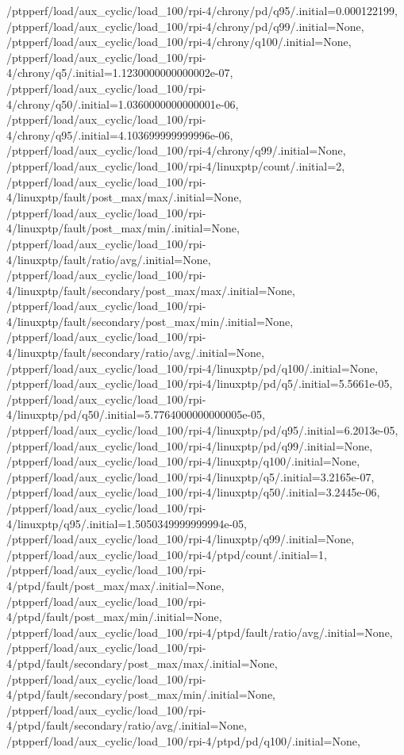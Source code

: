 {    /ptpperf/load/aux_cyclic/load_100/rpi-4/chrony/pd/q95/.initial=0.000122199,
    /ptpperf/load/aux_cyclic/load_100/rpi-4/chrony/pd/q99/.initial=None,
    /ptpperf/load/aux_cyclic/load_100/rpi-4/chrony/q100/.initial=None,
    /ptpperf/load/aux_cyclic/load_100/rpi-4/chrony/q5/.initial=1.1230000000000002e-07,
    /ptpperf/load/aux_cyclic/load_100/rpi-4/chrony/q50/.initial=1.0360000000000001e-06,
    /ptpperf/load/aux_cyclic/load_100/rpi-4/chrony/q95/.initial=4.103699999999996e-06,
    /ptpperf/load/aux_cyclic/load_100/rpi-4/chrony/q99/.initial=None,
    /ptpperf/load/aux_cyclic/load_100/rpi-4/linuxptp/count/.initial=2,
    /ptpperf/load/aux_cyclic/load_100/rpi-4/linuxptp/fault/post_max/max/.initial=None,
    /ptpperf/load/aux_cyclic/load_100/rpi-4/linuxptp/fault/post_max/min/.initial=None,
    /ptpperf/load/aux_cyclic/load_100/rpi-4/linuxptp/fault/ratio/avg/.initial=None,
    /ptpperf/load/aux_cyclic/load_100/rpi-4/linuxptp/fault/secondary/post_max/max/.initial=None,
    /ptpperf/load/aux_cyclic/load_100/rpi-4/linuxptp/fault/secondary/post_max/min/.initial=None,
    /ptpperf/load/aux_cyclic/load_100/rpi-4/linuxptp/fault/secondary/ratio/avg/.initial=None,
    /ptpperf/load/aux_cyclic/load_100/rpi-4/linuxptp/pd/q100/.initial=None,
    /ptpperf/load/aux_cyclic/load_100/rpi-4/linuxptp/pd/q5/.initial=5.5661e-05,
    /ptpperf/load/aux_cyclic/load_100/rpi-4/linuxptp/pd/q50/.initial=5.7764000000000005e-05,
    /ptpperf/load/aux_cyclic/load_100/rpi-4/linuxptp/pd/q95/.initial=6.2013e-05,
    /ptpperf/load/aux_cyclic/load_100/rpi-4/linuxptp/pd/q99/.initial=None,
    /ptpperf/load/aux_cyclic/load_100/rpi-4/linuxptp/q100/.initial=None,
    /ptpperf/load/aux_cyclic/load_100/rpi-4/linuxptp/q5/.initial=3.2165e-07,
    /ptpperf/load/aux_cyclic/load_100/rpi-4/linuxptp/q50/.initial=3.2445e-06,
    /ptpperf/load/aux_cyclic/load_100/rpi-4/linuxptp/q95/.initial=1.5050349999999994e-05,
    /ptpperf/load/aux_cyclic/load_100/rpi-4/linuxptp/q99/.initial=None,
    /ptpperf/load/aux_cyclic/load_100/rpi-4/ptpd/count/.initial=1,
    /ptpperf/load/aux_cyclic/load_100/rpi-4/ptpd/fault/post_max/max/.initial=None,
    /ptpperf/load/aux_cyclic/load_100/rpi-4/ptpd/fault/post_max/min/.initial=None,
    /ptpperf/load/aux_cyclic/load_100/rpi-4/ptpd/fault/ratio/avg/.initial=None,
    /ptpperf/load/aux_cyclic/load_100/rpi-4/ptpd/fault/secondary/post_max/max/.initial=None,
    /ptpperf/load/aux_cyclic/load_100/rpi-4/ptpd/fault/secondary/post_max/min/.initial=None,
    /ptpperf/load/aux_cyclic/load_100/rpi-4/ptpd/fault/secondary/ratio/avg/.initial=None,
    /ptpperf/load/aux_cyclic/load_100/rpi-4/ptpd/pd/q100/.initial=None,
}

